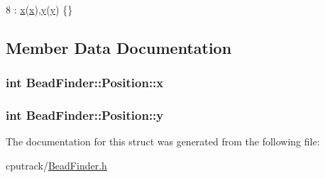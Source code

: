 \begin{DoxyCode}
8 : \hyperlink{struct_bead_finder_1_1_position_a47ada55a5d19ee4090ca76f701c5f20a}{x}(\hyperlink{struct_bead_finder_1_1_position_a47ada55a5d19ee4090ca76f701c5f20a}{x}),\hyperlink{struct_bead_finder_1_1_position_ad45fb2f56e63c82fba43e12b5e16eeec}{y}(\hyperlink{struct_bead_finder_1_1_position_ad45fb2f56e63c82fba43e12b5e16eeec}{y}) \{\}
\end{DoxyCode}


\subsection{Member Data Documentation}
\subsubsection[{\texorpdfstring{x}{x}}]{\setlength{\rightskip}{0pt plus 5cm}int Bead\+Finder\+::\+Position\+::x}\hypertarget{struct_bead_finder_1_1_position_a47ada55a5d19ee4090ca76f701c5f20a}{}\label{struct_bead_finder_1_1_position_a47ada55a5d19ee4090ca76f701c5f20a}
\subsubsection[{\texorpdfstring{y}{y}}]{\setlength{\rightskip}{0pt plus 5cm}int Bead\+Finder\+::\+Position\+::y}\hypertarget{struct_bead_finder_1_1_position_ad45fb2f56e63c82fba43e12b5e16eeec}{}\label{struct_bead_finder_1_1_position_ad45fb2f56e63c82fba43e12b5e16eeec}


The documentation for this struct was generated from the following file\+:\begin{DoxyCompactItemize}
\item 
cputrack/\hyperlink{_bead_finder_8h}{Bead\+Finder.\+h}\end{DoxyCompactItemize}
